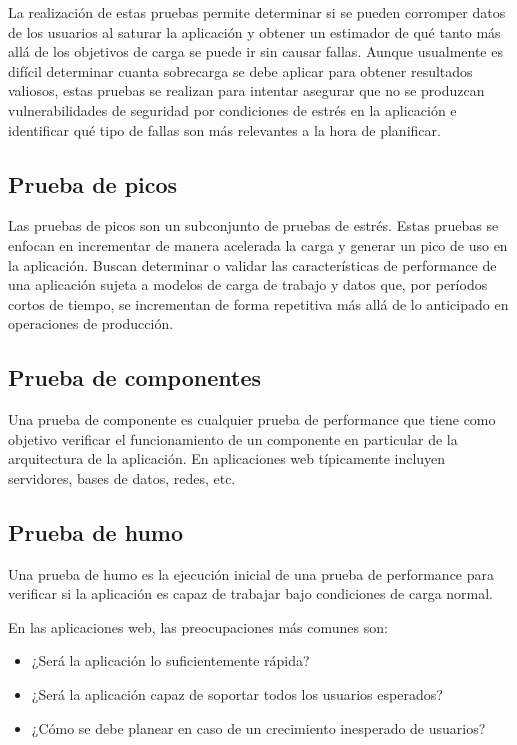 La realización de estas pruebas permite determinar si se pueden corromper datos de los usuarios al saturar la aplicación y obtener un estimador de qué tanto más allá de los objetivos de carga se puede ir sin causar fallas.
Aunque usualmente es difícil determinar cuanta sobrecarga se debe aplicar para obtener resultados valiosos, estas pruebas se realizan para intentar asegurar que no se produzcan vulnerabilidades de seguridad por condiciones de estrés en la aplicación e identificar qué tipo de fallas son más relevantes a la hora de planificar.

	\subsection{Prueba de picos}
	Las pruebas de picos son un subconjunto de pruebas de estrés. Estas pruebas se enfocan en incrementar de manera acelerada la carga y generar un pico de uso en la aplicación.	
Buscan determinar o validar las características de performance de una aplicación sujeta a modelos de carga de trabajo y datos que, por períodos cortos de tiempo, se incrementan de forma repetitiva más allá de lo anticipado en operaciones de producción.

  \subsection{Prueba de componentes}
  Una prueba de componente es cualquier prueba de performance que tiene como objetivo verificar el funcionamiento de un componente en particular de la arquitectura de la aplicación. En aplicaciones web típicamente incluyen servidores, bases de datos, redes, etc.
    
	\subsection{Prueba de humo}
	Una prueba de humo es la ejecución inicial de una prueba de performance para verificar si la aplicación es capaz de trabajar bajo condiciones de carga normal.
	
En las aplicaciones web, las preocupaciones más comunes son:
	\begin{itemize}
		\item
		¿Será la aplicación lo suficientemente rápida?
		\item
		¿Será la aplicación capaz de soportar todos los usuarios esperados?
		\item
		¿Cómo se debe planear en caso de un crecimiento inesperado de usuarios?
	\end{itemize}

